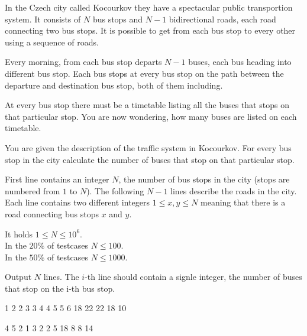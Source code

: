 





In the Czech city called Kocourkov they have a spectacular public transportion system.
It consists of $N$ bus stops and $N-1$ bidirectional roads, each road connecting two bus stops.
It is possible to get from each bus stop to every other using a sequence of roads.

Every morning, from each bus stop departs $N-1$ buses, each bus heading into different bus stop.
Each bus stops at every bus stop on the path between the departure and destination bus stop, both of them including.

At every bus stop there must be a timetable listing all the buses that stops on that particular stop.
You are now wondering, how many buses are listed on each timetable.


You are given the description of the traffic system in Kocourkov.
For every bus stop in the city calculate the number of buses that stop on that particular stop.


First line contains an integer $N$, the number of bus stops in the city (stops are numbered from $1$ to $N$).
The following $N-1$ lines describe the roads in the city.
Each line contains two different integers $1 \le x, y \le N$ meaning that there is a road connecting bus stops $x$ and $y$.

\smallskip
\noindent
It holds $1 \leq N \leq 10^6$.\\
In the $20\%$ of testcases $N \leq 100$.\\
In the $50\%$ of testcases $N \leq 1000$.


Output $N$ lines. The $i$-th line should contain a signle integer, the number of buses that stop on the i-th bus stop.


1 2
2 3
3 4
4 5
5 6
18
22
22
18
10
\sampleEND

\bigskip

4 5
2 1
3 2
2 5
18
8
8
14
\sampleEND


